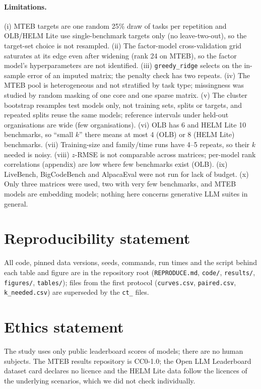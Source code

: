 \documentclass{article}
\begin{document}
\paragraph{Limitations.} (i) MTEB targets are one random 25\% draw of tasks per repetition and OLB/HELM Lite use single-benchmark targets only (no leave-two-out), so the target-set choice is not resampled. (ii) The factor-model cross-validation grid saturates at its edge even after widening (rank 24 on MTEB), so the factor model's hyperparameters are not identified. (iii) \texttt{greedy\_ridge} selects on the in-sample error of an imputed matrix; the penalty check has two repeats. (iv) The MTEB pool is heterogeneous and not stratified by task type; missingness was studied by random masking of one core and one sparse matrix. (v) The cluster bootstrap resamples test models only, not training sets, splits or targets, and repeated splits reuse the same models; reference intervals under held-out organisations are wide (few organisations). (vi) OLB has 6 and HELM Lite 10 benchmarks, so ``small $k$'' there means at most 4 (OLB) or 8 (HELM Lite) benchmarks. (vii) Training-size and family/time runs have 4--5 repeats, so their $k$ needed is noisy. (viii) $z$-RMSE is not comparable across matrices; per-model rank correlations (appendix) are low where few benchmarks exist (OLB). (ix) LiveBench, BigCodeBench and AlpacaEval were not run for lack of budget. (x) Only three matrices were used, two with very few benchmarks, and MTEB models are embedding models; nothing here concerns generative LLM suites in general.

\section*{Reproducibility statement}
All code, pinned data versions, seeds, commands, run times and the script behind each table and figure are in the repository root (\texttt{REPRODUCE.md}, \texttt{code/}, \texttt{results/}, \texttt{figures/}, \texttt{tables/}); files from the first protocol (\texttt{curves.csv}, \texttt{paired.csv}, \texttt{k\_needed.csv}) are superseded by the \texttt{ct\_} files.

\section*{Ethics statement}
The study uses only public leaderboard scores of models; there are no human subjects. The MTEB results repository is CC0-1.0; the Open LLM Leaderboard dataset card declares no licence and the HELM Lite data follow the licences of the underlying scenarios, which we did not check individually.
\end{document}
